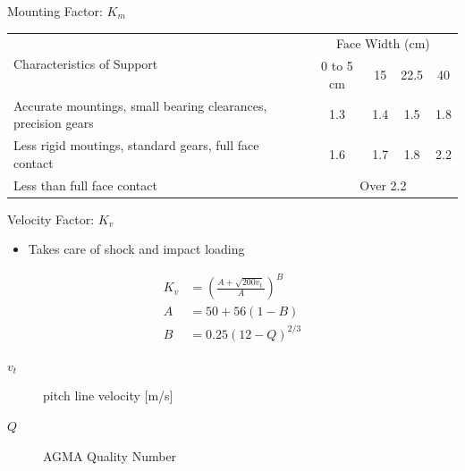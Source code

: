 \documentclass[
10pt,
a4paper,
openany,
svgnames,
]{book}
\begin{document}

\begin{frame}{Mounting Factor: $K_{m}$}
  \begin{table}[htbp]
    \centering
    \begin{tabular}{p{6cm}cccc}
      \toprule[1pt]
      \multirow{2}{*}{Characteristics of Support} & \multicolumn{4}{c}{Face Width (cm)} \\
      & 0 to 5 cm & 15 & 22.5 & 40 \\
      \midrule
      Accurate mountings, small bearing clearances, precision gears & 1.3 & 1.4 & 1.5 & 1.8 \\
      \midrule[0.1pt]
      Less rigid moutings, standard gears, full face contact & 1.6 & 1.7 & 1.8 & 2.2 \\
      \midrule[0.1pt]
      Less than full face contact & \multicolumn{4}{c}{Over 2.2} \\
      \bottomrule
    \end{tabular}
  \end{table}
\end{frame}

\begin{frame}{Velocity Factor: $K_{v}$}
  \begin{itemize}
    \item Takes care of shock and impact loading
  \end{itemize}
  \begin{align*}
    K_{v} &= \left( \frac{A + \sqrt{200 v_{t}}}{A} \right)^{B} \\
    A &= 50 + 56(1 - B) \\
    B &= 0.25(12 - Q)^{2/3}
  \end{align*}
  \begin{description}
    \item[$v_{t}$] pitch line velocity [m/s]
    \item[$Q$] AGMA Quality Number
  \end{description}
\end{frame}
\end{document}
